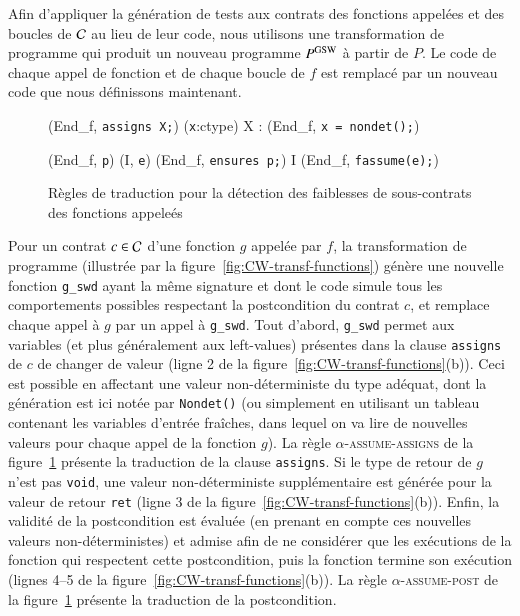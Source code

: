 Afin d'appliquer la génération de tests aux contrats des fonctions appelées et
des boucles de ${\mathcal{C}}$ au lieu de leur code, nous utilisons une transformation de
programme qui produit un nouveau programme $P^{\mathrm{GSW}}$ à partir de $P$.
Le code de chaque appel de fonction et de chaque boucle de $f$ est remplacé
par un nouveau code que nous définissons maintenant.

\begin{figure}[tb]
  \scriptsize{
    {
      {}
      {(End_f, \mbox{\lstinline'assigns X;'})
        \forall (\mbox{\lstinline'x'}:ctype) \in X :
        (End_f, \mbox{\lstinline'x = nondet();'})}{}
    }

    {
      {(End_f, \mbox{\lstinline'p'})  (I, \mbox{\lstinline'e'})}
      {(End_f, \mbox{\lstinline'ensures p;'})
        I \concat (End_f, \mbox{\lstinline'fassume(e);'})}{}
    }
  }
  \caption{Règles de traduction pour la détection des faiblesses de
    sous-contrats des fonctions appeleés}
  \label{fig:assume-annot}
\end{figure}

Pour un contrat $c\in{\ensuremath\mathcal{C}}$ d'une fonction $g$ appelée par $f$, la transformation
de programme (illustrée par la figure~\ref{fig:CW-transf-functions}) génère une
nouvelle fonction \lstinline{g_swd} ayant la même signature et dont le code
simule tous les comportements possibles respectant la postcondition du
contrat $c$, et remplace chaque appel à $g$ par un appel à \lstinline{g_swd}.
Tout d'abord, \lstinline{g_swd} permet aux variables (et plus généralement aux
left-values) présentes dans la clause \lstinline'assigns' de $c$ de changer de
valeur (ligne 2 de la figure~\ref{fig:CW-transf-functions}(b)).
Ceci est possible en affectant une valeur non-déterministe du type adéquat,
dont la génération est ici notée par \lstinline{Nondet()} (ou simplement en
utilisant un tableau contenant les variables d'entrée fraîches, dans lequel on
va lire de nouvelles valeurs pour chaque appel de la fonction $g$).
La règle \textsc{$\alpha$-assume-assigns} de la figure~\ref{fig:assume-annot}
présente la traduction de la clause \lstinline'assigns'.
Si le type de retour de $g$ n'est pas \lstinline{void}, une valeur
non-déterministe supplémentaire est générée pour la valeur de retour
\lstinline{ret} (ligne 3 de la figure~\ref{fig:CW-transf-functions}(b)).
Enfin, la validité de la postcondition est évaluée (en prenant en compte ces
nouvelles valeurs non-déterministes) et admise afin de ne considérer que les
exécutions de la fonction qui respectent cette postcondition, puis la fonction
termine son exécution (lignes 4--5 de la
figure~\ref{fig:CW-transf-functions}(b)).
La règle \textsc{$\alpha$-assume-post} de la figure~\ref{fig:assume-annot}
présente la traduction de la postcondition.

